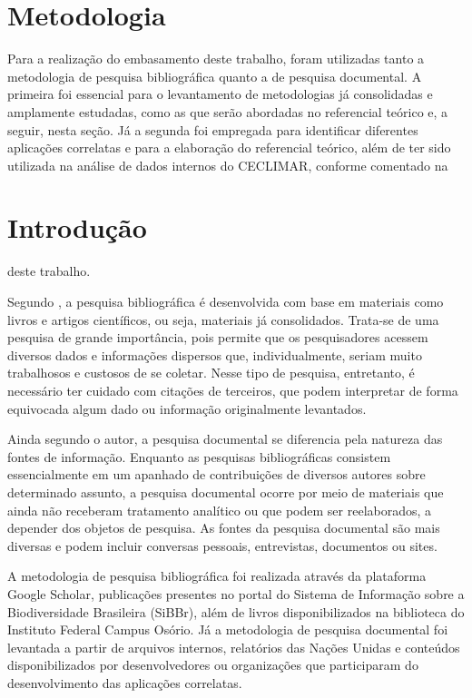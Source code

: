 \chapter{Metodologia}\label{metodologia}
Para a realização do embasamento deste trabalho, foram utilizadas tanto a metodologia de pesquisa bibliográfica quanto a de pesquisa documental. A primeira foi essencial para o levantamento de metodologias já consolidadas e amplamente estudadas, como as que serão abordadas no referencial teórico e, a seguir, nesta seção. Já a segunda foi empregada para identificar diferentes aplicações correlatas e para a elaboração do referencial teórico, além de ter sido utilizada na análise de dados internos do CECLIMAR, conforme comentado na \chapter{Introdução} \label{chapter:intro} deste trabalho.

Segundo , a pesquisa bibliográfica é desenvolvida com base em materiais como livros e artigos científicos, ou seja, materiais já consolidados. Trata-se de uma pesquisa de grande importância, pois permite que os pesquisadores acessem diversos dados e informações dispersos que, individualmente, seriam muito trabalhosos e custosos de se coletar. Nesse tipo de pesquisa, entretanto, é necessário ter cuidado com citações de terceiros, que podem interpretar de forma equivocada algum dado ou informação originalmente levantados.

Ainda segundo o autor, a pesquisa documental se diferencia pela natureza das fontes de informação. Enquanto as pesquisas bibliográficas consistem essencialmente em um apanhado de contribuições de diversos autores sobre determinado assunto, a pesquisa documental ocorre por meio de materiais que ainda não receberam tratamento analítico ou que podem ser reelaborados, a depender dos objetos de pesquisa. As fontes da pesquisa documental são mais diversas e podem incluir conversas pessoais, entrevistas, documentos ou sites.

A metodologia de pesquisa bibliográfica foi realizada através da plataforma Google Scholar, publicações presentes no portal do Sistema de Informação sobre a Biodiversidade Brasileira (SiBBr), além de livros disponibilizados na biblioteca do Instituto Federal Campus Osório. Já a metodologia de pesquisa documental foi levantada a partir de arquivos internos, relatórios das Nações Unidas e conteúdos disponibilizados por desenvolvedores ou organizações que participaram do desenvolvimento das aplicações correlatas.

